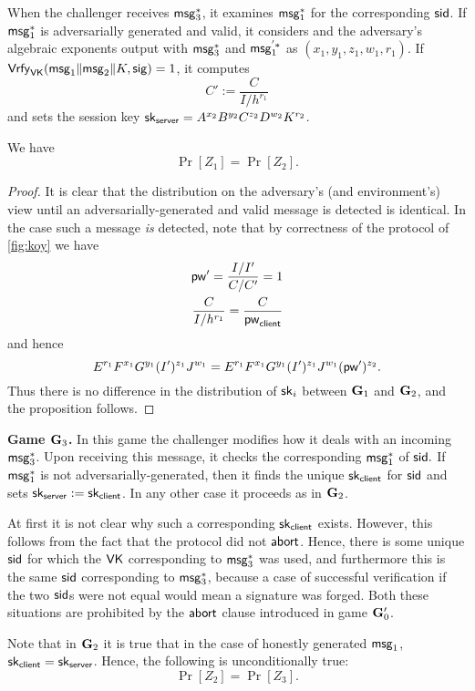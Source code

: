 When the challenger receives $\mathsf{msg}_{3}^{*}$, it examines $\mathsf{msg}_{1}^{*}$ for the corresponding $\mathsf{sid}$. If $\mathsf{msg}_{1}^{*}$ is adversarially generated and valid, it considers and the adversary's algebraic exponents output with $\mathsf{msg}_{3}^{*}$ and $\mathsf{msg}_{1}^{'*}$ as $(x_1,y_1,z_1,w_1,r_1)$. If $\mathsf{Vrfy}_{\mathsf{VK}}(\mathsf{msg}_{1}\|\mathsf{msg}_{2}\|K,\mathsf{sig})=1$, it computes $$C':= \frac{C}{I/h^{r_1}}$$ and sets the session key $\mathsf{sk}_{\mathsf{server}} = A^{x_2}B^{y_2}C^{z_2}D^{w_2}K^{r_2}$.

\begin{lemma} We have
	$$\Pr[Z_1]=\Pr[Z_2].$$
\end{lemma}

\begin{proof}
	It is clear that the distribution on the adversary's (and environment's) view until an adversarially-generated and valid message is detected is identical. In the case such a message \textit{is} detected, note that by correctness of the protocol of \cref{fig:koy} we have
	\begin{align*}
		\mathsf{pw}'=\frac{I/I'}{C/C'}=1\\
		\frac{C}{I/h^{r_1}} = \frac{C}{\mathsf{pw}_{\mathsf{client}}}
	\end{align*}
	and hence $$E^{r_1}F^{x_1}G^{y_1}(I')^{z_1}J^{w_1} = E^{r_1}F^{x_1}G^{y_1}(I')^{z_1}J^{w_1}(\mathsf{pw}')^{z_2}.$$ Thus there is no difference in the distribution of $\mathsf{sk}_i$ between $\mathbf{G}_1$ and $\mathbf{G}_2$, and the proposition follows.
\end{proof}

\textbf{Game $\mathbf{G}_3$.} In this game the challenger modifies how it deals with an incoming $\mathsf{msg}_{3}^{*}$. Upon receiving this message, it checks the corresponding $\mathsf{msg}_{1}^{*}$ of $\mathsf{sid}.$ If $\mathsf{msg}_{1}^{*}$ is not adversarially-generated, then it finds the unique $\mathsf{sk}_{\mathsf{client}}$ for $\mathsf{sid}$ and sets $\mathsf{sk}_{\mathsf{server}} := \mathsf{sk}_{\mathsf{client}}$. In any other case it proceeds as in $\mathbf{G}_2$.

At first it is not clear why such a corresponding $\mathsf{sk}_{\mathsf{client}}$ exists. However, this follows from the fact that the protocol did not $\mathsf{abort}$. Hence, there is some unique $\mathsf{sid}$ for which the $\mathsf{VK}$ corresponding to $\mathsf{msg}_{3}^{*}$ was used, and furthermore this is the same $\mathsf{sid}$ corresponding to $\mathsf{msg}_{3}^{*}$, because a case of successful verification if the two $\mathsf{sid}$s were not equal would mean a signature was forged. Both these situations are prohibited by the $\mathsf{abort}$ clause introduced in game $\mathbf{G}_0'$.

Note that in $\mathbf{G}_2$ it is true that in the case of honestly generated $\mathsf{msg}_{1}$, $\mathsf{sk}_{\mathsf{client}} = \mathsf{sk}_{\mathsf{server}}$. Hence, the following is unconditionally true: $$\Pr[Z_2]=\Pr[Z_3].$$

